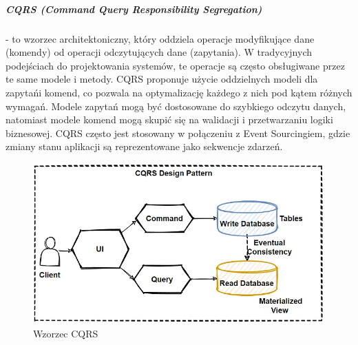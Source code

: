 \subparagraph{CQRS (Command Query Responsibility Segregation)} - to wzorzec architektoniczny, który oddziela operacje modyfikujące dane (komendy) od operacji odczytujących dane (zapytania). W tradycyjnych podejściach do projektowania systemów, te operacje są często obsługiwane przez te same modele i metody. CQRS proponuje użycie oddzielnych modeli dla zapytań\linebreak i komend, co pozwala na optymalizację każdego z nich pod kątem różnych wymagań. Modele zapytań mogą być dostosowane do szybkiego odczytu danych, natomiast modele komend mogą skupić się na walidacji i przetwarzaniu logiki biznesowej. CQRS często jest stosowany w połączeniu z Event Sourcingiem, gdzie zmiany stanu aplikacji są reprezentowane jako sekwencje zdarzeń.

\begin{figure}[H]
    \centering
    \includegraphics[width=1\linewidth]{Obrazy/cqrs.png}
    \caption{Wzorzec CQRS}
    \label{fig:enter-label}
\end{figure}

